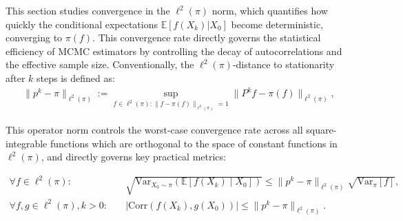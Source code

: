 \documentclass[preprint]{imsart}
\theoremstyle{plain}
\theoremstyle{definition}
\begin{document}
This section studies convergence in the $\ell^2(\pi)$ norm, which quantifies 
how quickly the conditional expectations $\mathbb{E}[f(X_k)|X_0]$ become 
deterministic, converging to $\pi(f)$. This convergence rate directly governs 
the statistical efficiency of MCMC estimators by controlling the decay of 
autocorrelations and the effective sample size. Conventionally, the $\ell^2(\pi)$-distance to stationarity after $k$ steps is defined as:
\begin{align}
    \|p^k - \pi\|_{\ell^{2}(\pi)} := \sup_{f \in \ell^{2}(\pi):\|f-\pi(f)\|_{\ell^{2}(\pi)}=1} \big\|P^{k}f-\pi(f)\big\|_{\ell^{2}(\pi)},
\end{align}

This operator norm controls the worst-case convergence rate across all 
square-integrable functions which are orthogonal to the space of constant functions in $\ell^{2}(\pi)$, and directly governs key practical metrics:

\begin{align}
    \forall f \in \ell^{2}(\pi): \quad & \sqrt{\mathrm{Var}_{X_{0} \sim \pi}\left(\mathbb{E}[f(X_{k})\mid X_{0}]\right)} \leq \|p^k - \pi\|_{\ell^{2}(\pi)} \sqrt{\mathrm{Var}_{\pi}[f]}, \\
    \forall f,g \in \ell^{2}(\pi), k > 0: \quad & \left|\mathrm{Corr}\left(f(X_k), g(X_0)\right)\right| \leq \|p^k - \pi\|_{\ell^{2}(\pi)}.
\end{align}
\end{document}
